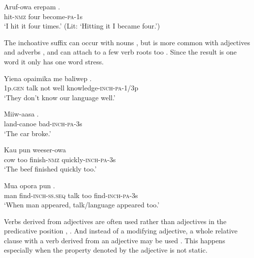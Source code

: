 \ea%
\label{ex:3:x192}
\gll Aruf-owa erepam . \\
hit-\textsc{nmz} four become-\textsc{pa}-1s \\
\glt`I hit it four times.' (Lit: `Hitting it I became four.')
\z

The inchoative suffix \textstyleEmphasizedVernacularWords{\nobreakdash-} can occur with nouns , but is more common with adjectives  and adverbs , and can attach to a few verb roots too . Since the result is one word it only has one word stress. 

\ea%
\label{ex:3:x193}
\gll Yiena opaimika me baliwep . \\
1p.\textsc{gen} talk not well knowledge-\textsc{inch}-\textsc{pa}-1/3p \\
\glt`They don't know our language well.'
\z

\ea%
\label{ex:3:x194}
\gll Miiw-aasa .{\footnotemark} \\
land-canoe bad-\textsc{inch}-\textsc{pa}-3s \\
\glt`The car broke.'
\z


\ea%
\label{ex:3:x195}
\gll Kau pun weeser-owa  \\
cow too finish-\textsc{nmz} quickly-\textsc{inch}-\textsc{pa}-3s \\
\glt`The beef finished quickly too.'
\z

\ea%
\label{ex:3:x196}
\gll Mua  opora pun . \\
man find-\textsc{inch}-\textsc{ss}.\textsc{seq} talk too find-\textsc{inch}-\textsc{pa}-3s\\
\glt`When man appeared, talk/language appeared too.'
\z

Verbs derived from adjectives are often used rather than adjectives in the predicative position , . And instead of a modifying adjective, a whole relative clause with a verb derived from an adjective may be used . This happens especially when the property denoted by the adjective is not static. 

